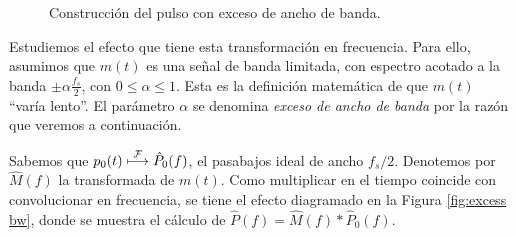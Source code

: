 \begin{figure}
\begin{center}
    \end{center}
    \caption{Construcción del pulso con exceso de ancho de banda.}\label{fig:construccion pulso exceso bw}
\end{figure}

Estudiemos el efecto que tiene esta transformación en frecuencia. Para ello, asumimos que $m(t)$ es una señal de banda limitada, con espectro acotado a la banda $\pm \alpha \frac{f_s}{2}$, con $0\leqslant \alpha \leqslant 1$. Esta es la definición matemática de que $m(t)$ ``varía lento''. El parámetro $\alpha$ se denomina \emph{exceso de ancho de banda} por la razón que veremos a continuación.

Sabemos que $p_0(t) \;\displaystyle{\mathop{\longmapsto}^{\mathcal{F}}}\; \hat{P}_0(f)$, el pasabajos ideal de ancho $f_s/2$. Denotemos por $\hat{M}(f)$ la transformada de $m(t)$. Como multiplicar en el tiempo coincide con convolucionar en frecuencia, se tiene el efecto diagramado en la Figura \ref{fig:excess bw}, donde se muestra el cálculo de $\hat{P}(f) = \hat{M}(f) * \hat{P}_0(f)$.

